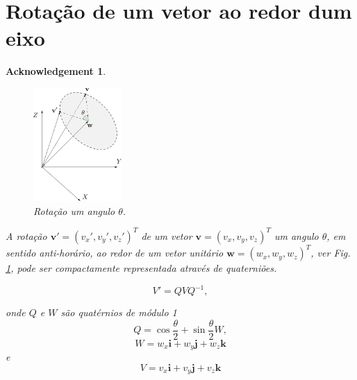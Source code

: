 \documentclass[a4paper,10pt]{report}
\newtheorem{acknowledgement}[theorem]{Acknowledgement}
\begin{document}
\section{Rotação de um vetor ao redor dum eixo}
\begin{acknowledgement}\label{ack:quaterion}


\begin{figure}[h!]
\centering
  \includegraphics[width=0.3\textwidth]{images/rotaq.eps} 
\caption{ Rotação um angulo $\theta$.}
\label{fig:rotaq}
\end{figure}

 A rotação $\mathbf{v}'=(v_x',v_y',v_z')^T$ de um vetor $\mathbf{v}=(v_x,v_y,v_z)^T$ 
 um angulo $\theta$, em sentido anti-horário, 
 ao redor de um vetor unitário $\mathbf{w}=(w_x,w_y,w_z)^T$, ver Fig. \ref{fig:rotaq}, 
 pode ser compactamente representada através de quaterniões.


\begin{equation}
 V' = Q V Q^{-1},
\end{equation}

onde $Q$ e $W$ são quatérnios de módulo 1
\begin{equation}
Q = \cos \frac {\theta}{2} + \sin \frac {\theta}{2} W,
\end{equation}
\begin{equation}
W=w_x\mathbf{i}+ w_y\mathbf{j}+ w_z\mathbf{k}
\end{equation}
e
\begin{equation}
V=v_x\mathbf{i}+ v_y\mathbf{j}+ v_z\mathbf{k}
\end{equation}
\end{acknowledgement}
\end{document}
